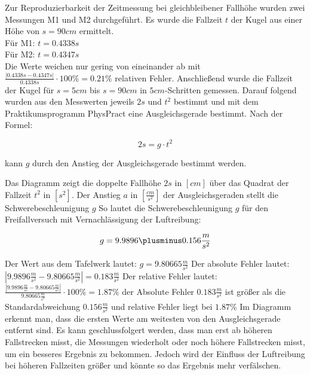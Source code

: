 \documentclass{protokoll}
\begin{document}
Zur Reproduzierbarkeit der Zeitmessung bei gleichbleibener Fallhöhe wurden zwei Messungen M1 und M2 durchgeführt.
Es wurde die Fallzeit $t$ der Kugel aus einer Höhe von $s = 90cm$ ermittelt. \\
Für M1: $t = 0.4338s$ \\
Für M2: $t = 0.4347s$ \\
Die Werte weichen nur gering von eineinander ab mit 
$\frac{|0.4338s - 0.4347s|}{0.4338s}\cdot 100 \% = 0.21 \%$ relativen Fehler.
Anschließend wurde die Fallzeit der Kugel für $s = 5cm$ bis $s = 90cm$ in $5cm$-Schritten gemessen.
Darauf folgend wurden aus den Messwerten jeweils $2s$ und $t^2$ bestimmt und mit dem
Praktikumsprogramm PhysPract eine Ausgleichsgerade bestimmt.
Nach der Formel:


\begin{equation}
2s = g\cdot t^2
\end{equation}




kann $g$ durch den Anstieg der Ausgleichsgerade bestimmt werden.




Das Diagramm zeigt die doppelte Fallhöhe $2s$ in $[cm]$ über das Quadrat der Fallzeit $t^2$ in $[s^2]$.
Der Anstieg $a$ in $[\frac{cm}{s^2}]$ der Ausgleichsgeraden stellt die Schwerebeschleunigung $g$
So lautet die Schwerebeschleunigung $g$ für den Freifallversuch mit Vernachlässigung der Luftreibung:


\begin{equation}
 g = 9.9896 \plusminus 0.156 \frac{m}{s^2} 
\end{equation}

 


Der Wert aus dem Tafelwerk lautet: $g = 9.80665 \frac{m}{s^2}$
Der absolute Fehler lautet: $ |9.9896 \frac{m}{s^2} - 9.80665 \frac{m}{s^2}|  = 0.183 \frac{m}{s^2}$
Der relative Fehler lautet: $\frac{|9.9896 \frac{m}{s^2} - 9.80665 \frac{m}{s^2}|}{9.80665 \frac{m}{s^2}}\cdot 100 \% = 1.87 \%$
der Absolute Fehler $0.183 \frac{m}{s^2}$ ist größer als die Standardabweichung $ 0.156 \frac{m}{s^2} $ 
und relative Fehler liegt bei $1.87 \%$ Im Diagramm erkennt man, dass die ersten Werte am weitesten von den Ausgleichsgerade entfernt sind. 
Es kann geschlussfolgert werden, dass man erst ab höheren Fallstrecken misst, die Messungen wiederholt oder noch höhere Fallstrecken misst,
um ein besseres Ergebnis zu bekommen. Jedoch wird der Einfluss der Luftreibung bei höheren Fallzeiten größer und könnte so das Ergebnis mehr verfälschen.
\end{document}
